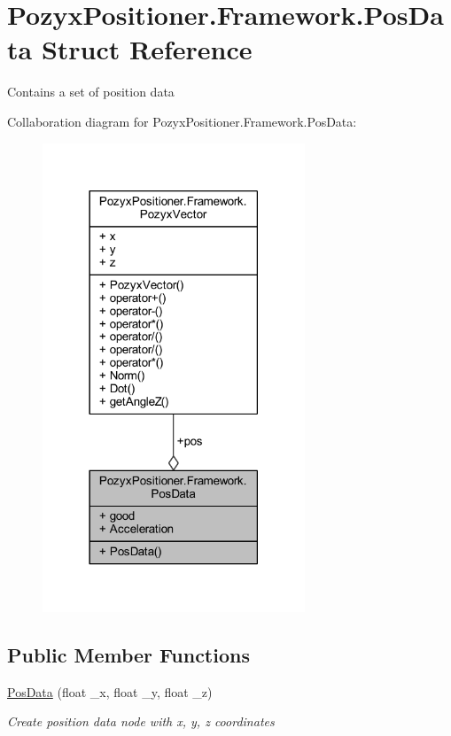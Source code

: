 \hypertarget{struct_pozyx_positioner_1_1_framework_1_1_pos_data}{}\section{Pozyx\+Positioner.\+Framework.\+Pos\+Data Struct Reference}
\label{struct_pozyx_positioner_1_1_framework_1_1_pos_data}


Contains a set of position data  




Collaboration diagram for Pozyx\+Positioner.\+Framework.\+Pos\+Data\+:\nopagebreak
\begin{figure}[H]
\begin{center}
\leavevmode
\includegraphics[width=222pt]{struct_pozyx_positioner_1_1_framework_1_1_pos_data__coll__graph}
\end{center}
\end{figure}
\subsection*{Public Member Functions}
\begin{DoxyCompactItemize}
\item 
\hyperlink{struct_pozyx_positioner_1_1_framework_1_1_pos_data_a3a87fee055f3468cb530c7b2cb71098f}{Pos\+Data} (float \+\_\+x, float \+\_\+y, float \+\_\+z)
\begin{DoxyCompactList}\small\item\em Create position data node with x, y, z coordinates \end{DoxyCompactList}\end{DoxyCompactItemize}
